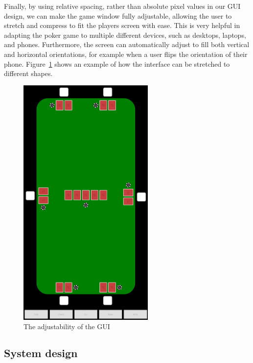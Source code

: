 Finally, by using relative spacing, rather than absolute pixel values in our
GUI design, we can make the game window fully adjustable, allowing the user
to stretch and compress to fit the players screen with ease. This is very
helpful in adapting the poker game to multiple different devices, such as
desktops, laptops, and phones. Furthermore, the screen can automatically
adjust to fill both vertical and horizontal orientations, for example when
a user flips the orientation of their phone. Figure~\ref{fig:adjustable} shows
an example of how the interface can be stretched to different shapes.

\begin{figure}[H]
    \centering
    \includegraphics[width=0.6\textwidth]{../images/adjustable.png}
    \caption{The adjustability of the GUI}%
    \label{fig:adjustable}
\end{figure}

\newpage{}

\subsection{System design}


